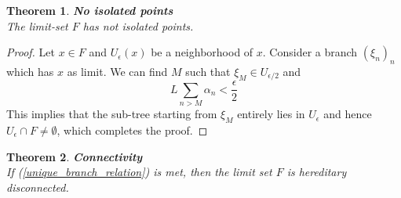 \documentclass[17pt]{extarticle}
\newtheorem{theorem}{Theorem}
\begin{document}
\begin{theorem}
	\textbf{No isolated points}\\
	The limit-set $F$ has not isolated points.
\end{theorem}
\begin{proof}
	Let $x\in F$ and $U_{\epsilon}(x)$ be a neighborhood of $x$. Consider a branch $(\xi_n)_n$ which has $x$ as limit. We can find $M$ such that $\xi_M\in U_{\epsilon/2}$ and
	$$
	L\sum_{n>M}\alpha_n<\frac{\epsilon}{2}
	$$
	This implies that the sub-tree starting from $\xi_M$ entirely lies in $U_{\epsilon}$ and hence $U_{\epsilon}\cap F\neq\emptyset$, which completes the proof.
\end{proof}

\begin{theorem} \label{connectivity}
	\textbf{Connectivity}\\
	If (\ref{unique_branch_relation}) is met, then the limit set $F$ is hereditary disconnected.
\end{theorem}
\end{document}
